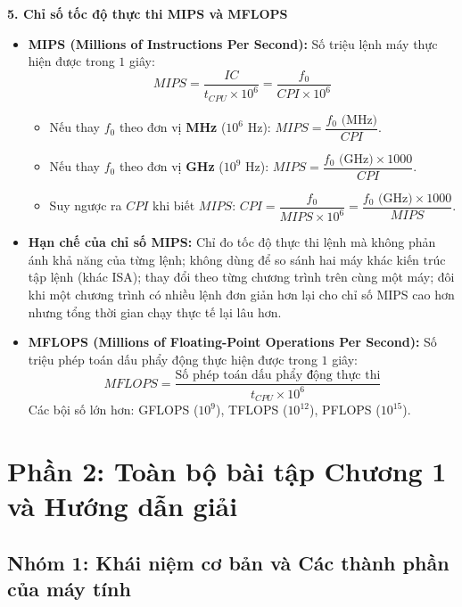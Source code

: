 \textbf{5. Chỉ số tốc độ thực thi MIPS và MFLOPS}
\begin{itemize}
    \item \textbf{MIPS (Millions of Instructions Per Second):} Số triệu lệnh máy thực hiện được trong $1$ giây:
    $$MIPS = \frac{IC}{t_{CPU} \times 10^6} = \frac{f_0}{CPI \times 10^6}$$
    \begin{itemize}
        \item Nếu thay $f_0$ theo đơn vị \textbf{MHz} ($10^6\text{ Hz}$): $MIPS = \dfrac{f_0\text{ (MHz)}}{CPI}$.
        \item Nếu thay $f_0$ theo đơn vị \textbf{GHz} ($10^9\text{ Hz}$): $MIPS = \dfrac{f_0\text{ (GHz)} \times 1000}{CPI}$.
        \item Suy ngược ra $CPI$ khi biết $MIPS$: $CPI = \dfrac{f_0}{MIPS \times 10^6} = \dfrac{f_0\text{ (GHz)} \times 1000}{MIPS}$.
    \end{itemize}
    \item \textbf{Hạn chế của chỉ số MIPS:} Chỉ đo tốc độ thực thi lệnh mà không phản ánh khả năng của từng lệnh; không dùng để so sánh hai máy khác kiến trúc tập lệnh (khác ISA); thay đổi theo từng chương trình trên cùng một máy; đôi khi một chương trình có nhiều lệnh đơn giản hơn lại cho chỉ số MIPS cao hơn nhưng tổng thời gian chạy thực tế lại lâu hơn.
    \item \textbf{MFLOPS (Millions of Floating-Point Operations Per Second):} Số triệu phép toán dấu phẩy động thực hiện được trong $1$ giây:
    $$MFLOPS = \frac{\text{Số phép toán dấu phẩy động thực thi}}{t_{CPU} \times 10^6}$$
    Các bội số lớn hơn: GFLOPS ($10^9$), TFLOPS ($10^{12}$), PFLOPS ($10^{15}$).
\end{itemize}

\newpage
\section{Phần 2: Toàn bộ bài tập Chương 1 và Hướng dẫn giải}

\subsection{Nhóm 1: Khái niệm cơ bản và Các thành phần của máy tính}

